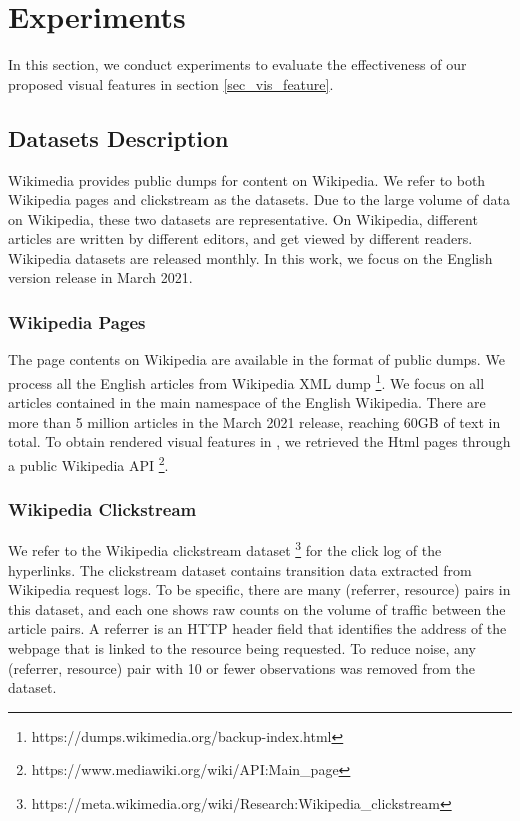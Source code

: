 \section{Experiments}

In this section, we conduct experiments to evaluate the effectiveness of our proposed visual features in section \ref{sec_vis_feature}.

\subsection{Datasets Description}

Wikimedia provides public dumps for content on Wikipedia. We refer to both Wikipedia pages and clickstream as the datasets. Due to the large volume of data on Wikipedia, these two datasets are representative. On Wikipedia, different articles are written by different editors, and get viewed by different readers. Wikipedia datasets are released monthly. In this work, we focus on the English version release in March 2021.

\subsubsection {Wikipedia Pages}

The page contents on Wikipedia are available in the format of public dumps. We process all the English articles from Wikipedia XML dump \footnote{https://dumps.wikimedia.org/backup-index.html}. We focus on all articles contained in the main namespace of the English Wikipedia. There are more than 5 million articles in the March 2021 release, reaching 60GB of text in total. To obtain rendered visual features in \cite{dimitrov2017makes}, we retrieved the Html pages through a public Wikipedia API \footnote{https://www.mediawiki.org/wiki/API:Main\_page}.

\subsubsection{Wikipedia Clickstream}

We refer to the Wikipedia clickstream dataset \footnote{https://meta.wikimedia.org/wiki/Research:Wikipedia\_clickstream} for the click log of the hyperlinks. The clickstream dataset contains transition data extracted from Wikipedia request logs. To be specific, there are many (referrer, resource) pairs in this dataset, and each one shows raw counts on the volume of traffic between the article pairs. A referrer is an HTTP header field that identifies the address of the webpage that is linked to the resource being requested. To reduce noise, any (referrer, resource) pair with 10 or fewer observations was removed from the dataset.

